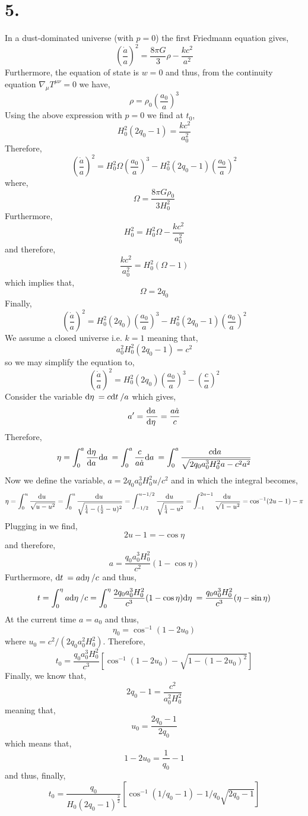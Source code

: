 \documentclass[12pt]{article}
\begin{document}
\section*{5.}

In a dust-dominated universe (with $p = 0$) the first Friedmann equation gives,
\[ \left( \frac{\dot{a}}{a} \right)^2 = \frac{8 \pi G}{3} \rho  - \frac{kc^2}{a^2}  \]
Furthermore, the equation of state is $w = 0$ and thus, from the continuity equation $\nabla_\mu T^{\mu \nu} = 0$ we have,
\[ \rho = \rho_0 \left( \frac{a_0}{a} \right)^3 \]
Using the above expression with $p = 0$ we find at $t_0$,
\[ H^2_0 (2 q_0 - 1) = \frac{k c^2}{a_0^2} \]
Therefore,
\[ \left( \frac{\dot{a}}{a} \right)^2 = H_0^2 \Omega \left( \frac{a_0}{a} \right)^3 - H_0^2( 2 q_0 - 1) \left( \frac{a_0}{a} \right)^2  \]
where,
\[ \Omega = \frac{8 \pi G \rho_0}{3 H_0^2} \]
Furthermore,
\[ H^2_0 = H_0^2 \Omega - \frac{kc^2}{a_0^2} \]
and therefore,
\[ \frac{k c^2}{a_0^2} = H_0^2(\Omega - 1) \]
which implies that,
\[ \Omega = 2 q_0 \]
Finally,
\[ \left( \frac{\dot{a}}{a} \right)^2 = H_0^2 (2 q_0) \left( \frac{a_0}{a} \right)^3 - H_0^2( 2 q_0 - 1) \left( \frac{a_0}{a} \right)^2 \]
We assume a closed universe i.e. $k = 1$ meaning that,
\[ a_0^2 H_0^2 (2 q_0 - 1) = c^2 \]
so we may simplify the equation to, 
\[ \left( \frac{\dot{a}}{a} \right)^2 = H_0^2 (2 q_0) \left( \frac{a_0}{a} \right)^3 - \left( \frac{c}{a} \right)^2 \]
Consider the variable $\mathrm{d}\eta \: = c \mathrm{d}t \: / a$ which gives,
\[ a' = \frac{\mathrm{d}a \:}{\mathrm{d}\eta \:} = \frac{a \dot{a}}{c} \]
Therefore,
\begin{align*}
\eta = \int_0^a \frac{\mathrm{d}\eta \:}{\mathrm{d}a \:} \mathrm{d}a \: = \int_0^a \frac{c}{a \dot{a}} \mathrm{d}a \: =  \int_0^a \frac{c \mathrm{d}a \:}{\sqrt{2 q_0 a_0^3 H_0^2 a - c^2 a^2}} 
\end{align*}
Now we define the variable, $a = 2 q_0 a_0^3 H_0^2 u / c^2$ and in which the integral becomes,
\[ \eta = \int_0^{u} \frac{\mathrm{d}u \:}{\sqrt{u - u^2}} = \int_0^u \frac{\mathrm{d}u \:}{\sqrt{\tfrac{1}{4} - (\tfrac{1}{2} - u)^2}} = \int^{u-1/2}_{-1/2} \frac{\mathrm{d}u \:}{\sqrt{\tfrac{1}{4} - u^2}} = \int^{2u - 1}_{-1} \frac{\mathrm{d}u \:}{\sqrt{1 - u^2}} = \cos^{-1}(2u - 1) - \pi \]
Plugging in we find,
\[ 2 u - 1 = - \cos{\eta} \]
and therefore, 
\[ a = \frac{q_0 a_0^3 H_0^2}{c^2} (1 - \cos{\eta}) \]
Furthermore, $\mathrm{d}t \: = a \mathrm{d}\eta \: / c$ and thus,
\[ t = \int_0^\eta a \mathrm{d}\eta \: / c = \int_0^\eta \frac{2 q_0 a_0^3 H_0^2}{c^3} (1 - \cos{\eta}) \mathrm{d}\eta \: = \frac{q_0 a_0^3 H_0^2}{c^3} (\eta - \sin{\eta}) \]
At the current time $a = a_0$ and thus,
\[ \eta_0 = \cos^{-1}(1 - 2 u_0) \]
where $u_0 = c^2 / (2 q_0 a_0^2 H_0^2)$. Therefore,
\[ t_0 =  \frac{q_0 a_0^3 H_0^2}{c^3} \left[ \cos^{-1}(1 - 2 u_0) - \sqrt{1 - (1 - 2 u_0)^2} \right] \]
Finally, we know that,
\[ 2 q_0 - 1 = \frac{c^2}{a_0^2 H_0^2} \]
meaning that,
\[ u_0 = \frac{2 q_0 - 1}{2 q_0} \]
which means that,
\[ 1 - 2 u_0 = \frac{1}{q_0} - 1 \]
and thus, finally,
\[ t_0 = \frac{q_0}{H_0(2q_0 - 1)^{\frac{3}{2}}} \left[ \cos^{-1}(1/q_0 - 1) - 1/q_0 \sqrt{2 q_0 - 1} \right] \]
\end{document}
